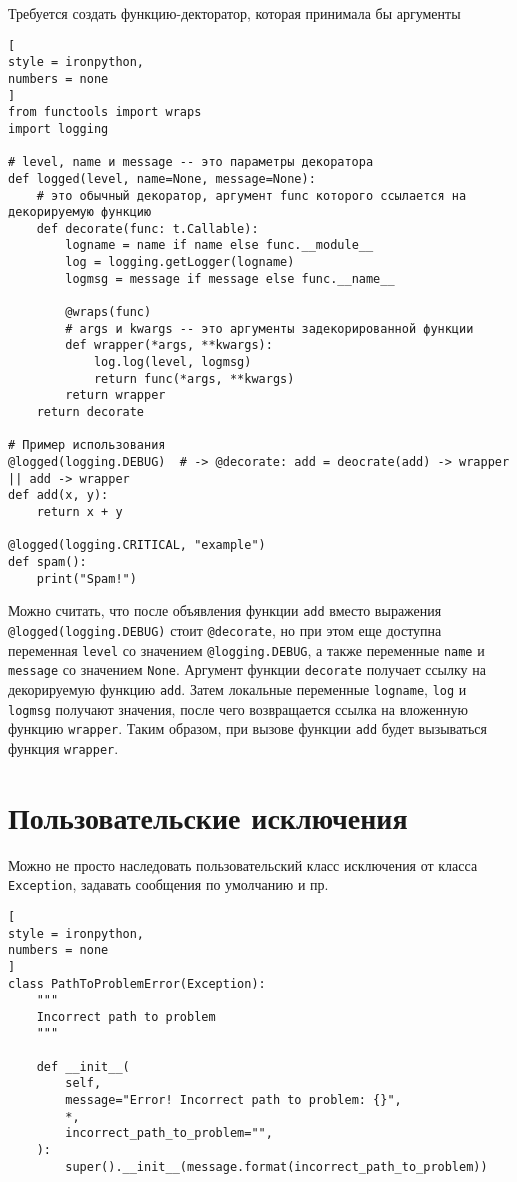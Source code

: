 \documentclass[%
	11pt,
	a4paper,
	utf8,
		]{article}
\begin{document}
Требуется создать функцию-декторатор, которая принимала бы аргументы
\begin{lstlisting}[
style = ironpython,
numbers = none
]
from functools import wraps
import logging

# level, name и message -- это параметры декоратора
def logged(level, name=None, message=None):
    # это обычный декоратор, аргумент func которого ссылается на декорируемую функцию
    def decorate(func: t.Callable):
        logname = name if name else func.__module__
        log = logging.getLogger(logname)
        logmsg = message if message else func.__name__
        
        @wraps(func)
        # args и kwargs -- это аргументы задекорированной функции
        def wrapper(*args, **kwargs):
            log.log(level, logmsg)
            return func(*args, **kwargs)
        return wrapper
    return decorate
    
# Пример использования
@logged(logging.DEBUG)  # -> @decorate: add = deocrate(add) -> wrapper || add -> wrapper
def add(x, y):
    return x + y
    
@logged(logging.CRITICAL, "example")
def spam():
    print("Spam!")
\end{lstlisting}

Можно считать, что после объявления функции \texttt{add} вместо выражения \verb|@logged(logging.DEBUG)| стоит \verb|@decorate|, но при этом еще доступна переменная \verb|level| со значением \verb|@logging.DEBUG|, а также переменные \texttt{name} и \texttt{message} со значением \texttt{None}. Аргумент функции \texttt{decorate} получает ссылку на декорируемую функцию \texttt{add}. Затем локальные переменные \texttt{logname}, \texttt{log} и \texttt{logmsg} получают значения, после чего возвращается ссылка на вложенную функцию \texttt{wrapper}. Таким образом, при вызове функции \texttt{add} будет вызываться функция \texttt{wrapper}.

\section{Пользовательские исключения}

Можно не просто наследовать пользовательский класс исключения от класса \verb|Exception|, задавать сообщения по умолчанию и пр.
\begin{lstlisting}[
style = ironpython,
numbers = none
]
class PathToProblemError(Exception):
    """
    Incorrect path to problem
    """
    
    def __init__(
        self,
        message="Error! Incorrect path to problem: {}",
        *,
        incorrect_path_to_problem="",
    ):
        super().__init__(message.format(incorrect_path_to_problem))
\end{lstlisting}
\end{document}
